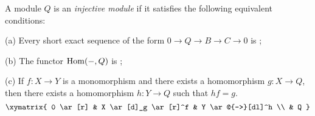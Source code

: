 \documentclass[12pt]{article}
\begin{document}
A module $Q$ is an {\it injective module}
if it satisfies the following equivalent conditions:

(a) Every short exact sequence
of the form $0 \to Q \to B \to C \to 0$ 
is ;

(b) The functor ${\rm Hom}(-, Q)$ 
is ;

(c) If $f : X \to Y$ is a monomorphism
and there exists a homomorphism $g : X \to Q$,
then there exists a homomorphism $h : Y \to Q$
such that $hf = g$.
$$
\xymatrix{
  0
        \ar[r]
  &
  X
        \ar[d]_g
        \ar[r]^f
  &
  Y
        \ar@{-->}[dl]^h
  \\
  &
  Q
}
$$
\end{document}
